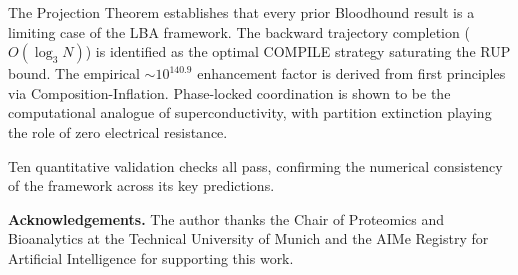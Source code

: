 \documentclass[twocolumn,11pt,a4paper]{article}
\theoremstyle{plain}
\theoremstyle{definition}
\theoremstyle{remark}
\begin{document}
The Projection Theorem establishes that every prior Bloodhound result is a limiting case of the LBA framework.  The backward trajectory completion ($O(\log_3 N)$) is identified as the optimal COMPILE strategy saturating the RUP bound.  The empirical $\sim 10^{140.9}$ enhancement factor is derived from first principles via Composition-Inflation.  Phase-locked coordination is shown to be the computational analogue of superconductivity, with partition extinction playing the role of zero electrical resistance.

Ten quantitative validation checks all pass, confirming the numerical consistency of the framework across its key predictions.

\bigskip
\noindent\textbf{Acknowledgements.}  The author thanks the Chair of Proteomics and Bioanalytics at the Technical University of Munich and the AIMe Registry for Artificial Intelligence for supporting this work.



\end{document}
